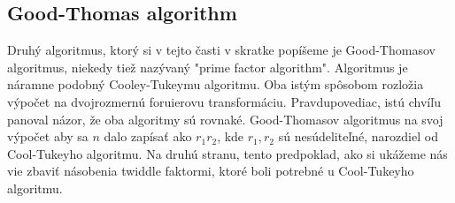 \subsection{Good-Thomas algorithm}
Druhý algoritmus, ktorý si v tejto časti v skratke popíšeme je 
Good-Thomasov algoritmus, niekedy tiež nazývaný "prime factor
algorithm". Algoritmus je náramne podobný Cooley-Tukeymu algoritmu. 
Oba istým
spôsobom rozložia výpočet na dvojrozmernú foruierovu transformáciu.
Pravdupovediac, istú chvíľu panoval názor, že oba algoritmy sú
rovnaké. Good-Thomasov algoritmus na svoj výpočet aby sa $n$ dalo
zapísať ako $r_1 r_2$, kde $r_1,r_2$ sú nesúdeliteľné, narozdiel od
Cool-Tukeyho algoritmu. Na druhú stranu, tento predpoklad, ako si
ukážeme nás vie zbaviť násobenia twiddle faktormi, ktoré boli potrebné
u Cool-Tukeyho algoritmu.

